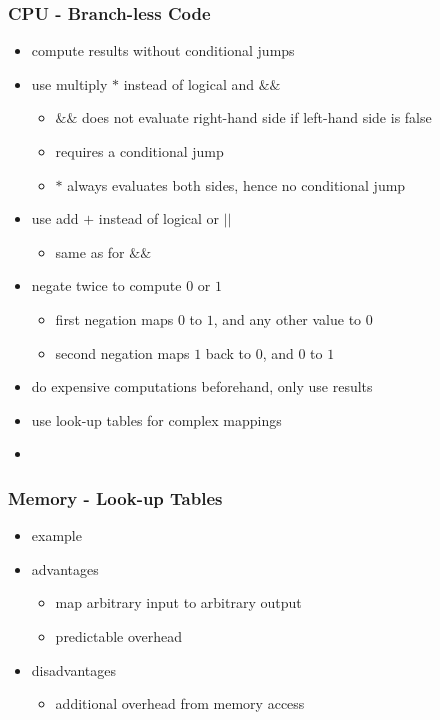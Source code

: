 \begin{frame}
 \frametitle{CPU - Branch-less Code}
 \begin{itemize}
  \item compute results without conditional jumps
  \item use multiply \( * \) instead of logical and \( \&\& \)
   \begin{itemize}
    \item \( \&\& \) does not evaluate right-hand side if left-hand side is false
    \item requires a conditional jump
    \item \( * \) always evaluates both sides, hence no conditional jump
   \end{itemize}
  \item use add \( + \) instead of logical or \( \vert\vert \)
   \begin{itemize}
    \item same as for \( \&\& \)
   \end{itemize}
  \item negate twice to compute \( 0 \) or \( 1 \)
   \begin{itemize}
    \item first negation maps \( 0 \) to \( 1 \), and any other value to 0
    \item second negation maps \( 1 \) back to \( 0 \), and \( 0 \) to \( 1 \)
   \end{itemize}
  \item do expensive computations beforehand, only use results
  \item use look-up tables for complex mappings
  \item {}
 \end{itemize}
\end{frame}

\begin{frame}
 \frametitle{Memory - Look-up Tables}
 \begin{itemize}
  \item example 
  \item advantages
  \begin{itemize}
   \item map arbitrary input to arbitrary output
   \item predictable overhead
  \end{itemize}
  \item disadvantages
  \begin{itemize}
   \item additional overhead from memory access
  \end{itemize}
 \end{itemize}
\end{frame}

